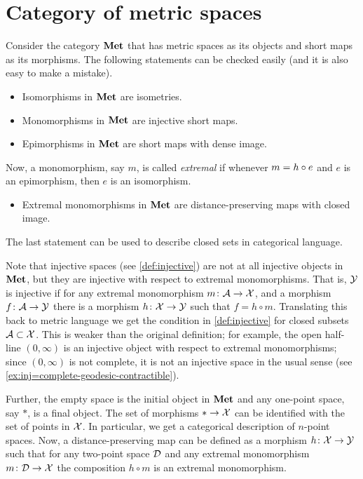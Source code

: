 \section{Category of metric spaces}\label{sec:met}

Consider the category $\mathbf{Met}$ that has metric spaces as its objects and short maps as its morphisms.
The following statements can be checked easily (and it is also easy to make a mistake).

\begin{itemize}
\item Isomorphisms in $\mathbf{Met}$ are isometries.
\item Monomorphisms in $\mathbf{Met}$ are injective short maps.
\item Epimorphisms in $\mathbf{Met}$ are short maps with dense image.
\end{itemize}
Now, a  monomorphism, say $m$, is called \emph{extremal}
if whenever $m\z=h\circ e$ and $e$ is an epimorphism, then $e$ is an isomorphism.
\begin{itemize}
\item Extremal monomorphisms in $\mathbf{Met}$ are distance-preserving maps with closed image.
\end{itemize}
The last statement can be used to describe closed sets in categorical language.

Note that injective spaces (see \ref{def:injective}) are not at all injective objects in $\mathbf{Met}$,
but they are injective with respect to extremal monomorphisms.
That is, $\mathcal{Y}$ is injective if for any extremal monomorphism $m\colon\mathcal{A}\to \mathcal{X}$, and a morphism $f\colon\mathcal{A}\to \mathcal{Y}$ there is a morphism $h\colon\mathcal{X}\to \mathcal{Y}$ such that $f=h\circ m$.
Translating this back to metric language we get the condition in \ref{def:injective} for closed subsets $\mathcal{A}\subset\mathcal{X}$.
This is weaker than the original definition; for example, the open half-line $(0,\infty)$ is an injective object with respect to extremal monomorphisms;
since $(0,\infty)$ is not complete, it is not an injective space in the usual sense (see \ref{ex:inj=complete-geodesic-contractible}).

Further, the empty space is the initial object in $\mathbf{Met}$ and any one-point space, say $*$, is a final object.
The set of morphisms $*\to \mathcal{X}$ can be identified with the set of points in $\mathcal{X}$.
In particular, we get a categorical description of $n$-point spaces.
Now, a distance-preserving map can be defined as a morphism $h\colon\mathcal{X}\to \mathcal{Y}$ such that for any two-point space $\mathcal{D}$ and any extremal monomorphism $m\colon\mathcal{D}\to \mathcal{X}$ the composition $h\circ m$ is an extremal monomorphism.


